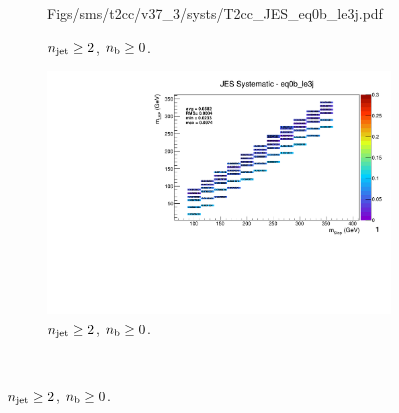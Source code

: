 \begin{figure}[ht!]
\begin{subfigure}[b]{0.32\textwidth}
    {Figs/sms/t2cc/v37_3/systs/T2cc_JES_eq0b_le3j.pdf}
    \caption{$n_{\text{jet}} \geq 2$, $n_{\text{b}} \geq 0$.}
  \end{subfigure}
  \begin{subfigure}[b]{0.32\textwidth}
    \includegraphics[width=\textwidth, page=1]{Figs/sms/t2cc/v37_3/systs/T2cc_JES_eq0b_le3j.pdf}
    \caption{$n_{\text{jet}} \geq 2$, $n_{\text{b}} \geq 0$.}
    \label{fig:sms-jes-t2cc-ge2j-ge0b}
  \end{subfigure}\\ %

\end{figure}
